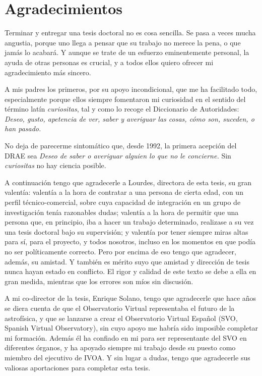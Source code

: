 \chapter*[Agradecimientos]{Agradecimientos}
\label{agradecimientos}

	Terminar y entregar una tesis doctoral no es cosa sencilla. Se
	pasa a veces mucha angustia, porque uno llega a pensar que su
	trabajo no merece la pena, o que jamás lo acabará. Y aunque se
	trate de un esfuerzo eminentemente personal, la ayuda de otras
	personas es crucial, y a todos ellos quiero ofrecer mi
	agradecimiento más sincero.
	
	 A mis padres los primeros, por su apoyo incondicional, que me
	ha facilitado todo, especialmente porque ellos siempre
	fomentaron mi curiosidad en el sentido del término latín
	\emph{curiositas}, tal y como lo recoge el Diccionario de
	Autoridades: \emph{Deseo, gusto, apetencia de ver, saber y
	averiguar las cosas, cómo son, suceden, o han pasado.}

	 No deja de parecerme sintomático que, desde 1992, la primera
	acepción del DRAE sea \emph{Deseo de saber o averiguar alguien
	lo que no le concierne.} Sin \emph{curiositas} no hay ciencia
	posible.
	
	 A continuación tengo que agradecerle a Lourdes, directora de
	esta tesis, su gran valentía: valentía a la hora de contratar a
	una persona de cierta edad, con un perfil técnico-comercial,
	sobre cuya capacidad de integración en un grupo de
	investigación tenía razonables dudas; valentía a la hora de
	permitir que una persona que, en principio, iba a hacer un
	trabajo determinado, realizase a su vez una tesis doctoral bajo
	su supervisión; y valentía por tener siempre miras altas para
	sí, para el proyecto, y todos nosotros, incluso en los momentos
	en que podía no ser políticamente correcto. Pero por encima de
	eso tengo que agradecer, además, su amistad. Y también es
	mérito suyo que amistad y dirección de tesis nunca hayan estado
	en conflicto. El rigor y calidad de este texto se debe a ella
	en gran medida, mientras que los errores son míos sin
	discusión.
	
	A mi co-director de la tesis, Enrique Solano, tengo que
	agradecerle que hace años se diera cuenta de que el
	Observatorio Virtual representaba el futuro de la astrofísica,
	y que se lanzarse a crear el Observatorio Virtual Español (SVO,
	Spanish Virtual Observatory), sin cuyo apoyo me habría sido
	imposible completar mi formación. Además él ha confiado en mi
	para ser representante del SVO en diferentes órganos, y ha
	apoyado siempre mi trabajo desde su puesto como miembro del
	ejecutivo de IVOA. Y sin lugar a dudas, tengo que agradecerle
	sus valiosas aportaciones para completar esta tesis.
	
